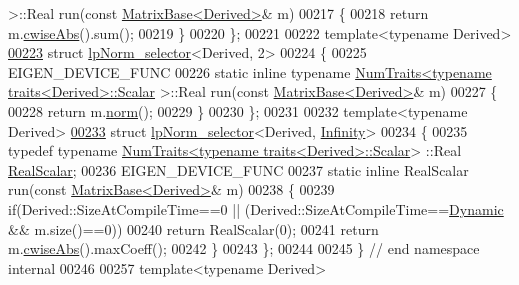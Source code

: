 \begin{DoxyCode}
      >::Real run(\textcolor{keyword}{const} \hyperlink{group___core___module_class_eigen_1_1_matrix_base}{MatrixBase<Derived>}& m)
00217   \{
00218     \textcolor{keywordflow}{return} m.\hyperlink{group___core___module_a8f2dbd5d9573c79c5dd356ddb29a0ee9}{cwiseAbs}().sum();
00219   \}
00220 \};
00221 
00222 \textcolor{keyword}{template}<\textcolor{keyword}{typename} Derived>
\hyperlink{struct_eigen_1_1internal_1_1lp_norm__selector_3_01_derived_00_012_01_4}{00223} \textcolor{keyword}{struct }\hyperlink{struct_eigen_1_1internal_1_1lp_norm__selector}{lpNorm\_selector}<Derived, 2>
00224 \{
00225   EIGEN\_DEVICE\_FUNC
00226   \textcolor{keyword}{static} \textcolor{keyword}{inline} \textcolor{keyword}{typename} \hyperlink{group___core___module_struct_eigen_1_1_num_traits}{NumTraits<typename traits<Derived>::Scalar}
      >::Real run(\textcolor{keyword}{const} \hyperlink{group___core___module_class_eigen_1_1_matrix_base}{MatrixBase<Derived>}& m)
00227   \{
00228     \textcolor{keywordflow}{return} m.\hyperlink{group___core___module_a196c4ec3c8ffdf5bda45d0f617154975}{norm}();
00229   \}
00230 \};
00231 
00232 \textcolor{keyword}{template}<\textcolor{keyword}{typename} Derived>
\hyperlink{struct_eigen_1_1internal_1_1lp_norm__selector_3_01_derived_00_01_infinity_01_4}{00233} \textcolor{keyword}{struct }\hyperlink{struct_eigen_1_1internal_1_1lp_norm__selector}{lpNorm\_selector}<Derived, \hyperlink{namespace_eigen_a7951593b031e13d90223c83d022ce99e}{Infinity}>
00234 \{
00235   \textcolor{keyword}{typedef} \textcolor{keyword}{typename} \hyperlink{group___core___module_struct_eigen_1_1_num_traits}{NumTraits<typename traits<Derived>::Scalar}>
      ::Real \hyperlink{group___sparse_core___module}{RealScalar};
00236   EIGEN\_DEVICE\_FUNC
00237   \textcolor{keyword}{static} \textcolor{keyword}{inline} RealScalar run(\textcolor{keyword}{const} \hyperlink{group___core___module_class_eigen_1_1_matrix_base}{MatrixBase<Derived>}& m)
00238   \{
00239     \textcolor{keywordflow}{if}(Derived::SizeAtCompileTime==0 || (Derived::SizeAtCompileTime==\hyperlink{namespace_eigen_ad81fa7195215a0ce30017dfac309f0b2}{Dynamic} && m.size()==0))
00240       \textcolor{keywordflow}{return} RealScalar(0);
00241     \textcolor{keywordflow}{return} m.\hyperlink{group___core___module_a8f2dbd5d9573c79c5dd356ddb29a0ee9}{cwiseAbs}().maxCoeff();
00242   \}
00243 \};
00244 
00245 \} \textcolor{comment}{// end namespace internal}
00246 
00257 \textcolor{keyword}{template}<\textcolor{keyword}{typename} Derived>

\end{DoxyCode}
